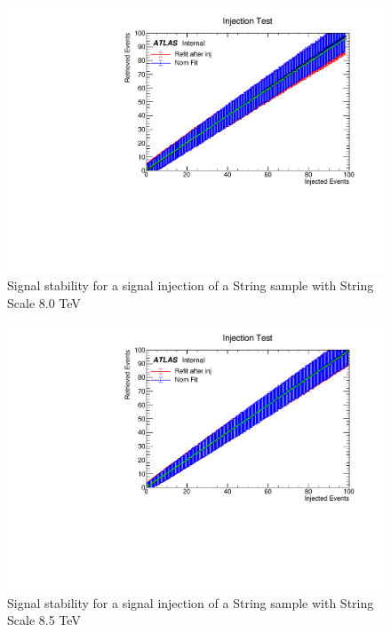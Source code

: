 \begin{figure}
    \centering
    \includegraphics[trim={0cm 0cm 1.6cm 1cm},clip,width=1.0\linewidth]{figures/app-GlobalFitStability/injectionFitStabilityStringScale8000.pdf}
    \caption{Signal stability for a signal injection of a String sample with String Scale 8.0 TeV}
\end{figure}
\begin{figure}
    \centering
    \includegraphics[trim={0cm 0cm 1.6cm 1cm},clip,width=1.0\linewidth]{figures/app-GlobalFitStability/injectionFitStabilityStringScale8500.pdf}
    \caption{Signal stability for a signal injection of a String sample with String Scale 8.5 TeV}
\end{figure}
